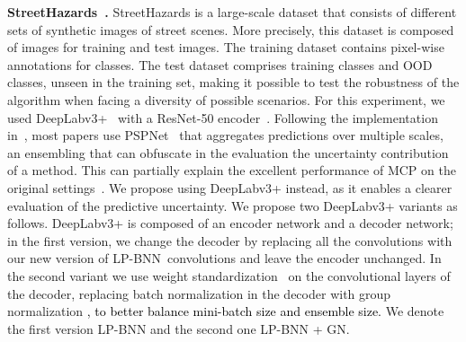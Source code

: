 \documentclass[10pt,twocolumn,letterpaper]{article}
\newcommand{\ab}[1]{\textcolor{black}{#1}}
\newcommand{\method}{LP-BNN\xspace}
\begin{document}
\noindent\textbf{StreetHazards~\cite{hendrycks2019anomalyseg}.}
StreetHazards is a large-scale dataset that consists of different sets of synthetic images of street scenes. More precisely, this dataset is composed of  images for training and  test images.
The training dataset contains pixel-wise annotations for  classes. The test dataset comprises  training classes and  OOD classes, unseen in the training set, making it possible to test the robustness of the algorithm when facing a diversity of possible scenarios. 
For this experiment, we used DeepLabv3+~\cite{chen2018encoder} with a ResNet-50 encoder~\cite{he2016deep}. Following the implementation in~\cite{hendrycks2019anomalyseg}, most papers use PSPNet~\cite{zhao2017pyramid} that aggregates predictions over multiple scales, an ensembling that can obfuscate in the evaluation the uncertainty contribution of a method. This can partially explain the excellent performance of MCP on the original settings~\cite{hendrycks2019anomalyseg}. We propose using DeepLabv3+ instead, as it enables a clearer evaluation of the predictive uncertainty.
 We propose two DeepLabv3+ variants as follows. DeepLabv3+ is composed of an encoder network and a decoder network; in the first version, we change the decoder by replacing all the convolutions with our new version of \method~convolutions and leave the encoder unchanged. In the second variant we use weight standardization~\cite{qiao2019rethinking} on the convolutional layers of the decoder, replacing batch normalization \cite{ioffe2015batch} in the decoder with group normalization \cite{wu2018group}\ab{, to better balance mini-batch size and ensemble size.} We denote the first version LP-BNN and the second one LP-BNN + GN.



                
\end{document}
